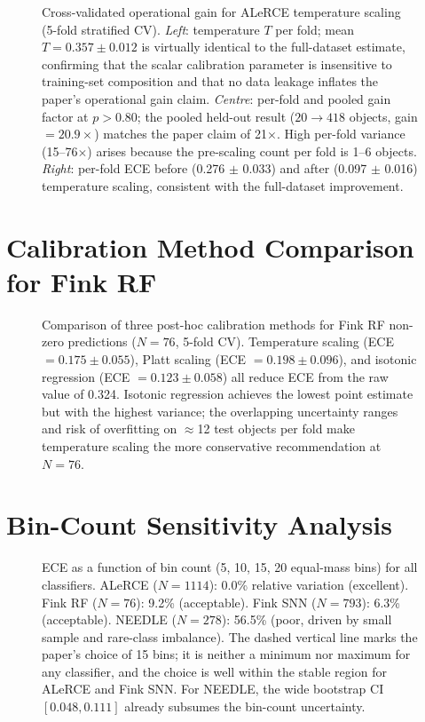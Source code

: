 \documentclass[twocolumn]{aastex631}
\begin{document}
\begin{figure}
\caption{Cross-validated operational gain for ALeRCE temperature scaling (5-fold stratified CV). \emph{Left}: temperature $T$ per fold; mean $T = 0.357 \pm 0.012$ is virtually identical to the full-dataset estimate, confirming that the scalar calibration parameter is insensitive to training-set composition and that no data leakage inflates the paper's operational gain claim. \emph{Centre}: per-fold and pooled gain factor at $p > 0.80$; the pooled held-out result ($20 \to 418$ objects, gain $= 20.9\times$) matches the paper claim of 21$\times$. High per-fold variance (15--76$\times$) arises because the pre-scaling count per fold is 1--6 objects. \emph{Right}: per-fold ECE before (0.276 $\pm$ 0.033) and after (0.097 $\pm$ 0.016) temperature scaling, consistent with the full-dataset improvement. \label{fig:alerce_cv}}
\end{figure}


\section{Calibration Method Comparison for Fink RF} \label{app:methods}

\begin{figure}
\caption{Comparison of three post-hoc calibration methods for Fink RF non-zero predictions ($N = 76$, 5-fold CV). Temperature scaling (ECE $= 0.175 \pm 0.055$), Platt scaling (ECE $= 0.198 \pm 0.096$), and isotonic regression (ECE $= 0.123 \pm 0.058$) all reduce ECE from the raw value of 0.324. Isotonic regression achieves the lowest point estimate but with the highest variance; the overlapping uncertainty ranges and risk of overfitting on $\approx$12 test objects per fold make temperature scaling the more conservative recommendation at $N = 76$. \label{fig:fink_methods}}
\end{figure}


\section{Bin-Count Sensitivity Analysis} \label{app:bins}

\begin{figure}
\caption{ECE as a function of bin count (5, 10, 15, 20 equal-mass bins) for all classifiers. ALeRCE ($N = 1114$): 0.0\% relative variation (excellent). Fink RF ($N = 76$): 9.2\% (acceptable). Fink SNN ($N = 793$): 6.3\% (acceptable). NEEDLE ($N = 278$): 56.5\% (poor, driven by small sample and rare-class imbalance). The dashed vertical line marks the paper's choice of 15 bins; it is neither a minimum nor maximum for any classifier, and the choice is well within the stable region for ALeRCE and Fink SNN. For NEEDLE, the wide bootstrap CI $[0.048, 0.111]$ already subsumes the bin-count uncertainty. \label{fig:bins}}
\end{figure}
\end{document}
